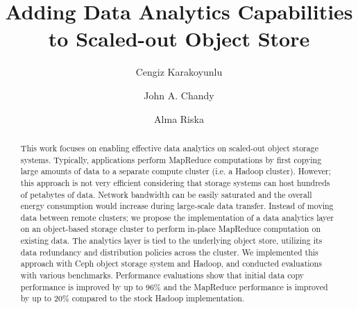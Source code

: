 \documentclass[preprint,12pt]{elsarticle}
\begin{document}
\begin{frontmatter}



\title{Adding Data Analytics Capabilities to Scaled-out Object Store}


\author[uconn]{Cengiz Karakoyunlu}
\author[uconn]{John A. Chandy}
\author[ariska]{Alma Riska}

\address[uconn]{Department of Electrical and Computer Engineering, University of Connecticut, Storrs, CT, 06269}
\address[ariska]{NetApp, Inc.}


\begin{abstract}
\label{sec-abstract}
This work focuses on enabling effective data analytics on scaled-out
object storage systems. Typically, applications perform MapReduce
computations by first copying large amounts of data to a separate compute
cluster (i.e. a Hadoop cluster). However; this approach is not very efficient
considering that storage systems can host hundreds of
petabytes of data. Network bandwidth can be easily saturated and the
overall energy consumption would increase during large-scale data
transfer. Instead of moving data between remote clusters; we
propose the implementation of a data analytics layer
on an object-based storage cluster to perform in-place MapReduce
computation on existing data. The analytics layer is tied to the underlying
object store, utilizing its data redundancy and distribution policies across
the cluster. We implemented this approach with Ceph object storage system and
Hadoop, and conducted evaluations with various benchmarks. Performance evaluations
show that initial data copy performance is improved by up to 96\% and
the MapReduce performance is improved by up to 20\% compared to the stock Hadoop
implementation.
\end{abstract}


\end{frontmatter}
\end{document}
